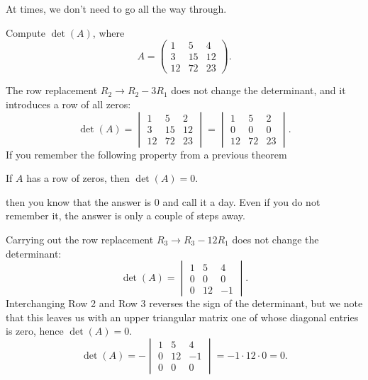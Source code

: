 \documentclass{ximera}
\begin{document}
At times, we don't need to go all the way through.
\begin{example}
  Compute $\det(A)$, where
  \[
    A =
    \begin{pmatrix}
      1 & 5 & 4 \\
      3 & 15 & 12 \\
      12 & 72 & 23
    \end{pmatrix}.
  \]
  \begin{explanation}
    The row replacement $R_2 \to R_2 - 3R_1$ does not change the
    determinant, and it introduces a row of all zeros:
    \[
      \det(A) =
      \begin{vmatrix}
        1 & 5 & 2 \\
        3 & 15 & 12 \\
        12 & 72 & 23
      \end{vmatrix}
      =
      \begin{vmatrix}
        1 & 5 & 2 \\
        0 & 0 & 0 \\
        12 & 72 & 23
      \end{vmatrix}.
    \]
    If you remember the following property from a previous theorem
    \begin{center}
      If $A$ has a row of zeros, then $\det(A) =0$.
    \end{center}
    then you know that the answer is 0 and call it a day. Even if you
    do not remember it, the answer is only a couple of steps away.

    Carrying out the row replacement $R_3 \to R_3 - 12 R_1$ does not change the
    determinant:
    \[
      \det(A) =
      \begin{vmatrix}
        1 & 5 & 4 \\
        0 & 0 & 0 \\
        0 & 12 & -1
      \end{vmatrix}.
    \]
    Interchanging Row 2 and Row 3 reverses the sign of the
    determinant, but we note that this leaves us with an upper
    triangular matrix one of whose diagonal entries is zero, hence
    $\det(A) = 0$.
    \[
      \det(A) = -
      \begin{vmatrix}
        1 & 5 & 4 \\
        0 & 12 & -1 \\
        0 & 0 & 0
      \end{vmatrix} = -1 \cdot 12 \cdot 0 = 0.
    \]
  \end{explanation}
\end{example}
\end{document}
